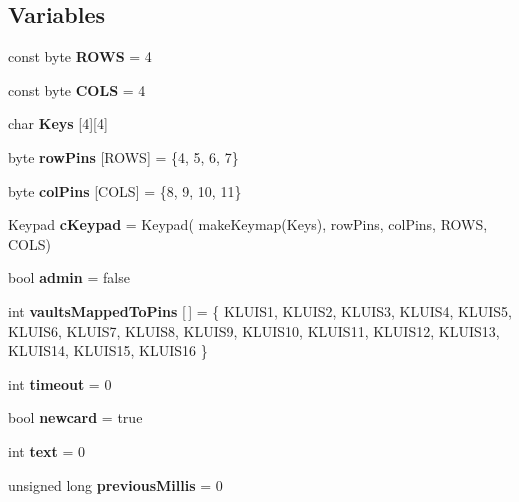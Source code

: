 \subsection*{Variables}
\begin{DoxyCompactItemize}
\item 
\mbox{\label{_kluis___v2_8ino_a829655a147df70dd4cc94eae40a2204e}} 
const byte {\bfseries R\+O\+WS} = 4
\item 
\mbox{\label{_kluis___v2_8ino_aefd90f1160eaa105bc910d4d7c46b815}} 
const byte {\bfseries C\+O\+LS} = 4
\item 
char {\bfseries Keys} \mbox{[}4\mbox{]}\mbox{[}4\mbox{]}
\item 
\mbox{\label{_kluis___v2_8ino_a6d6753e0ae098b31e2f84d4024e361cf}} 
byte {\bfseries row\+Pins} \mbox{[}R\+O\+WS\mbox{]} = \{4, 5, 6, 7\}
\item 
\mbox{\label{_kluis___v2_8ino_aa9fece7b062124080e4b2976f9a8b675}} 
byte {\bfseries col\+Pins} \mbox{[}C\+O\+LS\mbox{]} = \{8, 9, 10, 11\}
\item 
\mbox{\label{_kluis___v2_8ino_a560cf48323e7951392704f4bbcb9b343}} 
Keypad {\bfseries c\+Keypad} = Keypad( make\+Keymap(Keys), row\+Pins, col\+Pins, R\+O\+WS, C\+O\+LS)
\item 
\mbox{\label{_kluis___v2_8ino_a2b91ea0bc21540d131b22cfdfe731575}} 
bool {\bfseries admin} = false
\item 
\mbox{\label{_kluis___v2_8ino_a522b2a57865b31c199c2638babe19420}} 
int {\bfseries vaults\+Mapped\+To\+Pins} \mbox{[}$\,$\mbox{]} = \{ K\+L\+U\+I\+S1, K\+L\+U\+I\+S2, K\+L\+U\+I\+S3, K\+L\+U\+I\+S4, K\+L\+U\+I\+S5, K\+L\+U\+I\+S6, K\+L\+U\+I\+S7, K\+L\+U\+I\+S8, K\+L\+U\+I\+S9, K\+L\+U\+I\+S10, K\+L\+U\+I\+S11, K\+L\+U\+I\+S12, K\+L\+U\+I\+S13, K\+L\+U\+I\+S14, K\+L\+U\+I\+S15, K\+L\+U\+I\+S16 \}
\item 
\mbox{\label{_kluis___v2_8ino_a493b57f443cc38b3d3df9c1e584d9d82}} 
int {\bfseries timeout} = 0
\item 
\mbox{\label{_kluis___v2_8ino_a0bd719b7c2e503945cca08d162f603ff}} 
bool {\bfseries newcard} = true
\item 
\mbox{\label{_kluis___v2_8ino_acb727b700580681a32b288d9ebc9b762}} 
int {\bfseries text} = 0
\item 
\mbox{\label{_kluis___v2_8ino_a86027ad9c9159f02624d136fb63364fe}} 
unsigned long {\bfseries previous\+Millis} = 0
\end{DoxyCompactItemize}


